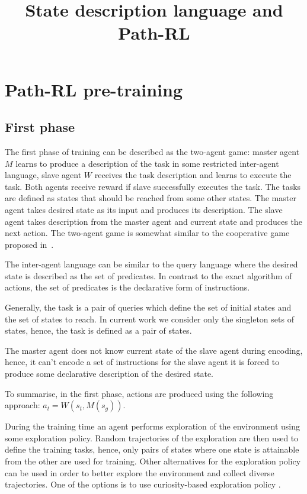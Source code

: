 \documentclass{article}
\title{State description language and Path-RL}
\author{}
\date{}
\begin{document}
\maketitle

\section{Path-RL pre-training}

\subsection{First phase}

The first phase of training can be described as the two-agent game: master agent $M$ learns to produce a description of the task in some restricted inter-agent language, slave agent $W$ receives the task description and learns to execute the task. Both agents receive reward if slave successfully executes the task. The tasks are defined as states that should be reached from some other states. The master agent takes desired state as its input and produces its description. The slave agent takes description from the master agent and current state and produces the next action. The two-agent game is somewhat similar to the cooperative game proposed in~\citep{Mordatch2018EmergenceOG}.

The inter-agent language can be similar to the query language where the desired state is described as the set of predicates. In contrast to the exact algorithm of actions, the set of predicates is the declarative form of instructions.

Generally, the task is a pair of queries which define the set of initial states and the set of states to reach. In current work we consider only the singleton sets of states, hence, the task is defined as a pair of states.

The master agent does not know current state of the slave agent during encoding, hence, it can't encode a set of instructions for the slave agent it is forced to produce some declarative description of the desired state.

To summarise, in the first phase, actions are produced using the following approach: $a_t = W(s_t, M(s_g))$.

During the training time an agent performs exploration of the environment using some exploration policy. Random trajectories of the exploration are then used to define the training tasks, hence, only pairs of states where one state is attainable from the other are used for training. Other alternatives for the exploration policy can be used in order to better explore the environment and collect diverse trajectories. One of the options is to use curiosity-based exploration policy \citep{Pathak2017CuriosityDrivenEB, Burda2019ExplorationBR}.
\end{document}
